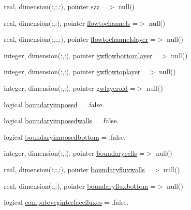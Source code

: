 \begin{DoxyCompactItemize}
real, dimension(\+:,\+:,\+:), pointer \mbox{\hyperlink{structmoduleporousmediaproperties_1_1t__extvar_a8d622ec6911fe1d6b37e5a2da0c9e9d6}{szz}} =$>$ null()
\item 
real, dimension(\+:,\+:), pointer \mbox{\hyperlink{structmoduleporousmediaproperties_1_1t__extvar_a90ec9674f956d9853908326c512488df}{flowtochannels}} =$>$ null()
\item 
real, dimension(\+:,\+:,\+:), pointer \mbox{\hyperlink{structmoduleporousmediaproperties_1_1t__extvar_ab27add21a9e440d2fd91ea6e5a3755ec}{flowtochannelslayer}} =$>$ null()
\item 
integer, dimension(\+:,\+:), pointer \mbox{\hyperlink{structmoduleporousmediaproperties_1_1t__extvar_af18fd8abcb88774f6be60fb244ac126a}{gwflowbottomlayer}} =$>$ null()
\item 
integer, dimension(\+:,\+:), pointer \mbox{\hyperlink{structmoduleporousmediaproperties_1_1t__extvar_a0007793fe521212942d02df05e781e21}{gwflowtoplayer}} =$>$ null()
\item 
integer, dimension(\+:,\+:), pointer \mbox{\hyperlink{structmoduleporousmediaproperties_1_1t__extvar_abd65a219a75e8c1858da766933ef929c}{gwlayerold}} =$>$ null()
\item 
logical \mbox{\hyperlink{structmoduleporousmediaproperties_1_1t__extvar_adbf3d10773e559a85ad5385ea1471b05}{boundaryimposed}} = .false.
\item 
logical \mbox{\hyperlink{structmoduleporousmediaproperties_1_1t__extvar_a77901f59904e3e414463e94424166ae4}{boundaryimposedwalls}} = .false.
\item 
logical \mbox{\hyperlink{structmoduleporousmediaproperties_1_1t__extvar_a87da03f6aff70f722fcfd9f4b9b9a343}{boundaryimposedbottom}} = .false.
\item 
integer, dimension(\+:,\+:), pointer \mbox{\hyperlink{structmoduleporousmediaproperties_1_1t__extvar_aaf2636907f8de6491af4f3abd4ad2445}{boundarycells}} =$>$ null()
\item 
real, dimension(\+:,\+:,\+:), pointer \mbox{\hyperlink{structmoduleporousmediaproperties_1_1t__extvar_a9c9f87b2f87f9b2b0bc9bc839d38e3a3}{boundaryfluxwalls}} =$>$ null()
\item 
real, dimension(\+:,\+:), pointer \mbox{\hyperlink{structmoduleporousmediaproperties_1_1t__extvar_a48770721a2676ed33f7d88665632be93}{boundaryfluxbottom}} =$>$ null()
\item 
logical \mbox{\hyperlink{structmoduleporousmediaproperties_1_1t__extvar_ab95a23ad039eae6eb1514d994adda1e9}{computeveginterfacefluxes}} = .false.

\end{DoxyCompactItemize}
